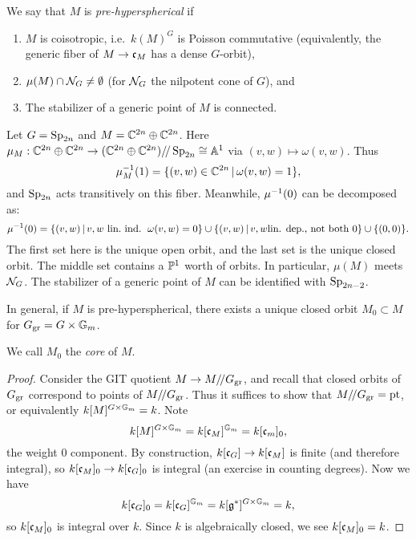\documentclass{article}
\begin{document}
\begin{dfn}
	We say that $M$ is \emph{pre-hyperspherical} if
	\begin{enumerate}
		\item $M$ is coisotropic, i.e.\ $k(M)^G$ is Poisson commutative (equivalently, the generic fiber of $M \to \mathfrak{c}_M$ has a dense $G$-orbit),
		\item $\mu(M) \cap \mathcal{N}_G \neq \emptyset$ (for $\mathcal{N}_G$ the nilpotent cone of $G$), and
		\item The stabilizer of a generic point of $M$ is connected.
	\end{enumerate}
\end{dfn}

\begin{ex}
	Let $G = \operatorname{Sp}_{2n}$ and $M = \mathbb{C}^{2n} \oplus \mathbb{C}^{2n}$.
	Here $\mu_M: \mathbb{C}^{2n} \oplus \mathbb{C}^{2n} \to (\mathbb{C}^{2n} \oplus \mathbb{C}^{2n}) /\mkern-3mu/ \operatorname{Sp}_{2n} \cong \mathbb{A}^1$ via $(v, w) \mapsto \omega(v, w)$.
	Thus
	\[
		\mu_M^{-1}(1) = \{ (v, w) \in \mathbb{C}^{2n} \, | \, \omega(v, w) = 1 \},
	\]
	and $\operatorname{Sp}_{2n}$ acts transitively on this fiber.
	Meanwhile, $\mu^{-1}(0)$ can be decomposed as:
	\[
		\mu^{-1}(0) = \{ (v, w) \, | \, v, w \textrm{ lin.\ ind.\, } \omega(v, w) = 0 \} \cup \{ (v, w) \, | \, v, w \textrm{lin. dep., not both } 0 \} \cup \{ (0, 0) \}.
	\]
	The first set here is the unique open orbit, and the last set is the unique closed orbit.
	The middle set contains a $\mathbb{P}^1$ worth of orbits.
	In particular, $\mu(M)$ meets $\mathcal{N}_G$.
	The stabilizer of a generic point of $M$ can be identified with $\operatorname{Sp}_{2n-2}$.
\end{ex}

\begin{prop}
	In general, if $M$ is pre-hyperspherical, there exists a unique closed orbit $M_0 \subset M$ for $G_{\operatorname{gr}} = G \times \mathbb{G}_m$.
\end{prop}

We call $M_0$ the \emph{core} of $M$.

\begin{proof}
	Consider the GIT quotient $M \to M /\mkern-3mu/ G_{\operatorname{gr}}$, and recall that closed orbits of $G_{\operatorname{gr}}$ correspond to points of $M /\mkern-3mu/ G_{\operatorname{gr}}$.
	Thus it suffices to show that $M /\mkern-3mu/ G_{\operatorname{gr}} = \operatorname{pt}$, or equivalently $k[M]^{G \times \mathbb{G}_m} = k$.
	Note
	\[
		k[M]^{G \times \mathbb{G}_m} = k[\mathfrak{c}_M]^{\mathbb{G}_m} = k[\mathfrak{c}_m]_0,
	\]
	the weight $0$ component.
	By construction, $k[\mathfrak{c}_G] \to k[\mathfrak{c}_M]$ is finite (and therefore integral), so $k[\mathfrak{c}_M]_0 \to k[\mathfrak{c}_G]_0$ is integral (an exercise in counting degrees).
	Now we have
	\[
		k[\mathfrak{c}_G]_0 = k[\mathfrak{c}_G]^{\mathbb{G}_m} = k[\mathfrak{g}^*]^{G \times \mathbb{G}_m} = k,
	\]
	so $k[\mathfrak{c}_M]_0$ is integral over $k$.
	Since $k$ is algebraically closed, we see $k[\mathfrak{c}_M]_0 = k$.
\end{proof}
\end{document}
